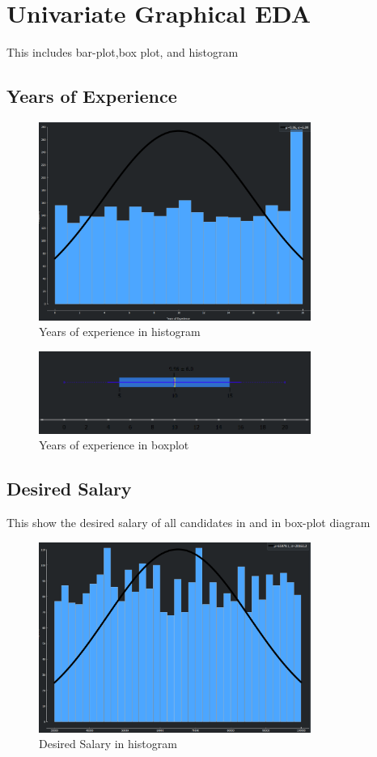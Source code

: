 \documentclass[lettersize,journal]{IEEEtran}
\begin{document}
\section{Univariate Graphical EDA}
This includes bar-plot,box plot, and histogram
\subsection{Years of Experience}

\begin{figure}[h]
\centering
\includegraphics[width=3.5in]{histrogram.png}
\caption{Years of experience in histogram}
\label{fig_5}
\end{figure}

\begin{figure}[h]
\centering
\includegraphics[width=3.5in]{boxpot.png}
\caption{Years of experience in boxplot}
\label{fig_5}
\end{figure}

\subsection{Desired Salary}
This show the desired salary of all candidates in  and in box-plot diagram
\vspace{28mm}

\begin{figure}[h]
\centering
\includegraphics[width=3.5in]{dshistrogram.png}
\caption{Desired Salary in histogram}
\label{fig_5}
\end{figure}
\end{document}
